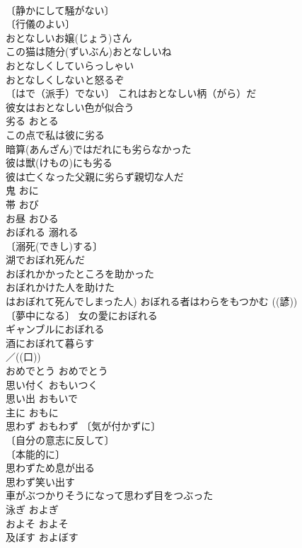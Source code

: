 \documentclass[8pt]{extreport}
\begin{document}
\begin{CJK}{UTF8}{min}
\\	〔静かにして騒がない〕
\\	〔行儀のよい〕
\\	おとなしいお嬢(じょう)さん 
\\	この猫は随分(ずいぶん)おとなしいね 
\\	おとなしくしていらっしゃい 
\\	おとなしくしないと怒るぞ 
\\	〔はで（派手）でない〕 これはおとなしい柄（がら）だ 
\\	彼女はおとなしい色が似合う 
\\	劣る	おとる	
\\	この点で私は彼に劣る 
\\	暗算(あんざん)ではだれにも劣らなかった 
\\	彼は獣(けもの)にも劣る 
\\	彼は亡くなった父親に劣らず親切な人だ 
\\	鬼	おに	
\\	帯	おび	
\\	お昼	おひる	
\\	おぼれる	溺れる	
\\	〔溺死(できし)する〕
\\	湖でおぼれ死んだ 
\\	おぼれかかったところを助かった 
\\	おぼれかけた人を助けた 
\\	はおぼれて死んでしまった人) おぼれる者はわらをもつかむ ((諺)) 
\\	〔夢中になる〕 女の愛におぼれる 
\\	ギャンブルにおぼれる 
\\	酒におぼれて暮らす 
\\	／((口)) 
\\	おめでとう	おめでとう	
\\	思い付く	おもいつく	
\\	思い出	おもいで	
\\	主に	おもに	
\\	思わず	おもわず	〔気が付かずに〕
\\	〔自分の意志に反して〕
\\	〔本能的に〕
\\	思わずため息が出る 
\\	思わず笑い出す 
\\	車がぶつかりそうになって思わず目をつぶった 
\\	泳ぎ	およぎ	
\\	およそ	およそ	
\\	及ぼす	およぼす	

\end{CJK}
\end{document}

